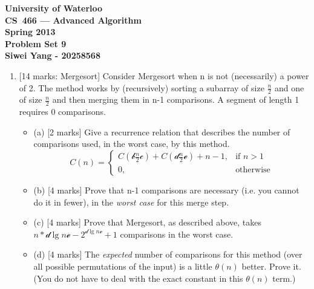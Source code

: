 \documentclass[12pt]{article}
\begin{document}
\begin{center}
\large\bf University of Waterloo\\
CS~466 --- Advanced Algorithm\\
Spring 2013\\
Problem Set 9\\
Siwei Yang - 20258568\\
\end{center}
\bigskip

\begin{enumerate}

\item{} [14 marks: Mergesort]
Consider Mergesort when n is not (necessarily) a power of 2. The method works by (recursively) sorting a subarray of size $\frac{n}{2}$ and one of size $\frac{n}{2}$ and then merging them in n-1 comparisons. A segment of length 1 requires 0 comparisons.
\begin{itemize}
\item{(a)} [2 marks]
Give a recurrence relation that describes the number of comparisons used, in the worst case, by this method.
\begin{equation}
C(n) =
\begin{cases}
    C(\mathcal{b} \frac{n}{2} \mathcal{c}) + C(\mathcal{d} \frac{n}{2} \mathcal{e}) + n - 1,& \text{if } n > 1\\
    0,              & \text{otherwise}
\end{cases}
\end{equation}

\item{(b)} [4 marks]
Prove that n-1 comparisons are necessary (i.e. you cannot do it in fewer), in the \textit{worst case} for this merge step.

\item{(c)} [4 marks]
Prove that Mergesort, as described above, takes $n * \mathcal{d} \lg{n} \mathcal{e} - 2^{\mathcal{d} \lg{n} \mathcal{e}} + 1$ comparisons in the worst case.

\item{(d)} [4 marks]
The \textit{expected} number of comparisons for this method (over all possible permutations of the input) is a little $\theta(n)$ better. Prove it. (You do not have to deal with the exact constant in this $\theta(n)$ term.)

\end{itemize}


\end{enumerate}
\end{document}
